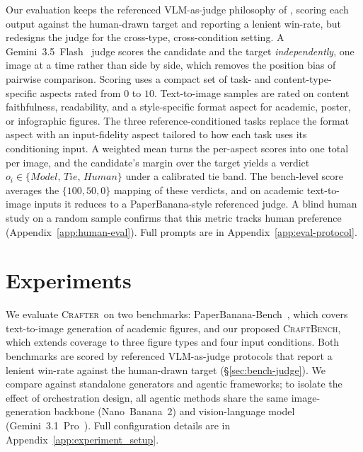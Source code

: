 \documentclass{llmxive}
\providecommand{\Crafter}{\textsc{Crafter}\xspace}
\providecommand{\CrafterBench}{\textsc{CraftBench}\xspace}
\providecommand{\PaperBananaBench}{PaperBanana-Bench\xspace}
\begin{document}
Our evaluation keeps the referenced VLM-as-judge philosophy of \citet{zhu2026paperbanana}, scoring each output against the human-drawn target and reporting a lenient win-rate, but redesigns the judge for the cross-type, cross-condition setting. A Gemini~3.5~Flash~\citep{gemini35flash} judge scores the candidate and the target \emph{independently}, one image at a time rather than side by side, which removes the position bias of pairwise comparison. Scoring uses a compact set of task- and content-type-specific aspects rated from $0$ to $10$. Text-to-image samples are rated on content faithfulness, readability, and a style-specific format aspect for academic, poster, or infographic figures. The three reference-conditioned tasks replace the format aspect with an input-fidelity aspect tailored to how each task uses its conditioning input. A weighted mean turns the per-aspect scores into one total per image, and the candidate's margin over the target yields a verdict $o_i \in \{\textit{Model},\,\textit{Tie},\,\textit{Human}\}$ under a calibrated tie band. The bench-level score averages the $\{100, 50, 0\}$ mapping of these verdicts, and on academic text-to-image inputs it reduces to a PaperBanana-style referenced judge. A blind human study on a random sample confirms that this metric tracks human preference (Appendix~\ref{app:human-eval}). Full prompts are in Appendix~\ref{app:eval-protocol}.


\section{Experiments}
\label{sec:experiments}

We evaluate \Crafter\ on two benchmarks: \PaperBananaBench~\citep{zhu2026paperbanana}, which covers text-to-image generation of academic figures, and our proposed \CrafterBench, which extends coverage to three figure types and four input conditions. Both benchmarks are scored by referenced VLM-as-judge protocols that report a lenient win-rate against the human-drawn target (\S\ref{sec:bench-judge}). We compare against standalone generators and agentic frameworks; to isolate the effect of orchestration design, all agentic methods share the same image-generation backbone (Nano~Banana~2) and vision-language model (Gemini~3.1~Pro~\citep{gemini31pro}). Full configuration details are in Appendix~\ref{app:experiment_setup}.
\end{document}
